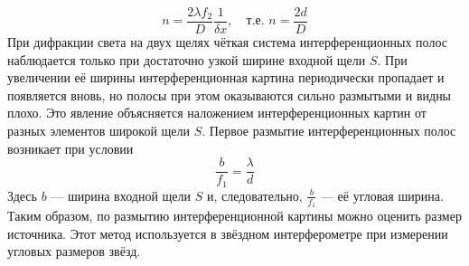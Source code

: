 \documentclass[a4paper, 12pt]{article}
\begin{document}
	\begin{equation}
		n=\frac{2\lambda f_2}{D}\frac{1}{\delta x},\quad \text{т.е. }n=\frac{2d}{D}
	\end{equation}
	При дифракции света на двух щелях чёткая система интерференционных полос наблюдается только при достаточно узкой ширине входной щели $S$. При увеличении её ширины интерференционная картина периодически пропадает и появляется вновь, но полосы при этом оказываются сильно размытыми и видны плохо. Это явление объясняется наложением интерференционных картин от разных элементов широкой щели $S$. Первое размытие интерференционных полос возникает при условии
	\begin{equation}
		\frac{b}{f_1}=\frac{\lambda}{d}
	\end{equation}
	Здесь $b$ — ширина входной щели $S$ и, следовательно, $\frac{b}{f_1}$ — её угловая ширина. Таким образом, по размытию интерференционной картины можно оценить размер источника. Этот метод используется в звёздном интерферометре при измерении угловых размеров звёзд.\par
\end{document}
